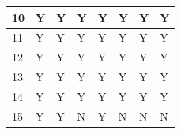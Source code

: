 \begin{table}[H]
\begin{tabular}{|l|l|l|l|l|l|l|l|}
10              & Y                                                              & Y                                                              & Y                                                             & Y                                                              & Y                                                             & Y                                                             & Y                                                             \\ \hline
11              & Y                                                              & Y                                                              & Y                                                             & Y                                                              & Y                                                             & Y                                                             & Y                                                             \\ \hline
12              & Y                                                              & Y                                                              & Y                                                             & Y                                                              & Y                                                             & Y                                                             & Y                                                             \\ \hline
13              & Y                                                              & Y                                                              & Y                                                             & Y                                                              & Y                                                             & Y                                                             & Y                                                             \\ \hline
14              & Y                                                              & Y                                                              & Y                                                             & Y                                                              & Y                                                             & Y                                                             & Y                                                             \\ \hline
15              & Y                                                              & Y                                                              & N                                                             & Y                                                              & N                                                             & N                                                             & N                                                             \\ \hline

\end{tabular}
\end{table}
